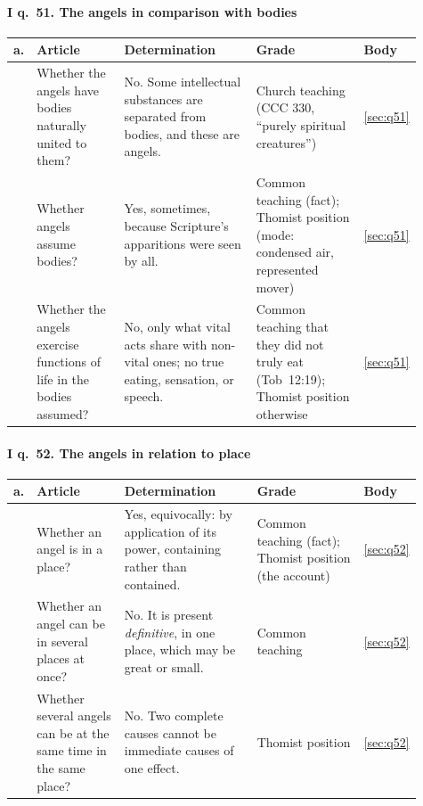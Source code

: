 \paragraph{I q.~51. The angels in comparison with bodies}

\begingroup\footnotesize
\begin{longtable}{>{\raggedright\arraybackslash}p{0.03\linewidth}>{\raggedright\arraybackslash}p{0.22\linewidth}>{\raggedright\arraybackslash}p{0.33\linewidth}>{\raggedright\arraybackslash}p{0.27\linewidth}>{\raggedright\arraybackslash}p{0.06\linewidth}}
\toprule
\textbf{a.} & \textbf{Article} & \textbf{Determination} & \textbf{Grade} & \textbf{Body}\\
\midrule
\endhead
1 & Whether the angels have bodies naturally united to them? & No. Some intellectual substances are separated from bodies, and these are angels. & Church teaching (CCC 330, ``purely spiritual creatures'') & \ref{sec:q51}\\
2 & Whether angels assume bodies? & Yes, sometimes, because Scripture's apparitions were seen by all. & Common teaching (fact); Thomist position (mode: condensed air, represented mover) & \ref{sec:q51}\\
3 & Whether the angels exercise functions of life in the bodies assumed? & No, only what vital acts share with non-vital ones; no true eating, sensation, or speech. & Common teaching that they did not truly eat (Tob~12:19); Thomist position otherwise & \ref{sec:q51}\\
\bottomrule
\end{longtable}
\endgroup

\paragraph{I q.~52. The angels in relation to place}

\begingroup\footnotesize
\begin{longtable}{>{\raggedright\arraybackslash}p{0.03\linewidth}>{\raggedright\arraybackslash}p{0.22\linewidth}>{\raggedright\arraybackslash}p{0.33\linewidth}>{\raggedright\arraybackslash}p{0.27\linewidth}>{\raggedright\arraybackslash}p{0.06\linewidth}}
\toprule
\textbf{a.} & \textbf{Article} & \textbf{Determination} & \textbf{Grade} & \textbf{Body}\\
\midrule
\endhead
1 & Whether an angel is in a place? & Yes, equivocally: by application of its power, containing rather than contained. & Common teaching (fact); Thomist position (the account) & \ref{sec:q52}\\
2 & Whether an angel can be in several places at once? & No. It is present \emph{definitive}, in one place, which may be great or small. & Common teaching & \ref{sec:q52}\\
3 & Whether several angels can be at the same time in the same place? & No. Two complete causes cannot be immediate causes of one effect. & Thomist position & \ref{sec:q52}\\
\bottomrule
\end{longtable}
\endgroup

